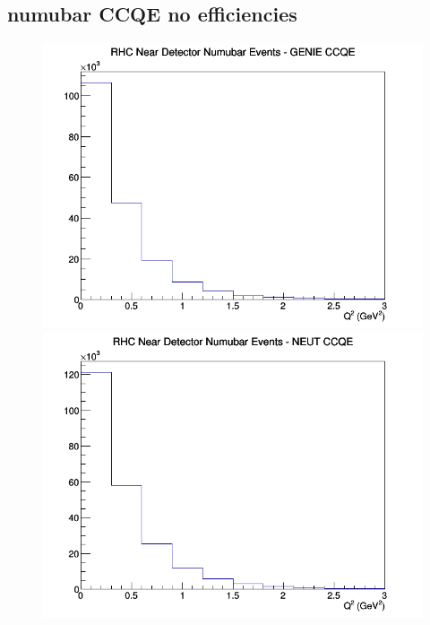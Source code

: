 \documentclass[12pt]{article}
\begin{document}
\subsection{numubar CCQE no efficiencies}
\begin{figure}[h]
\includegraphics[width=\linewidth]{Q2/nominal/CCQE_RHC_ND_numubar_Q2_GENIE.png}
\endminipage
{}
\includegraphics[width=\linewidth]{Q2/nominal/CCQE_RHC_ND_numubar_Q2_NEUT.png}
\endminipage
{}

\end{figure}
\end{document}
